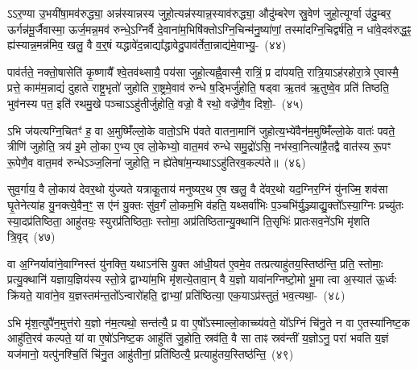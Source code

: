 ऽऽर॒ण्या उ॒भयी॑षा॒मव॑रुद्ध्या॒ अन्न॑स्यान्नस्य जुहो॒त्यन्न॑स्यान्न॒स्याव॑रुद्ध्या॒ औदु॑म्बरेण स्रु॒वेण॑ जुहो॒त्यूर्ग्वा उ॑दु॒म्बर॒ ऊर्गन्न॑मू॒र्जैवास्मा॒ ऊर्ज॒मन्न॒मव॑ रुन्धे॒\-ऽग्निर्वै दे॒वाना॑म॒भिषि॑क्तो\-ऽग्नि॒चिन्म॑नु॒ष्या॑णां॒ तस्मा॑दग्नि॒चिद्वर्\mbox{}ष॑ति॒ न धा॑वे॒दव॑रुद्ध॒ꣴ॒ ह्य॑स्यान्न॒मन्न॑मिव॒ खलु॒ वै व॒र्॒\mbox{}षं यद्धावे॑द॒न्नाद्या᳚द्धावेदु॒पाव॑र्तेता॒न्नाद्य॑मे॒वाभ्यु॒-~(४४)\ip

पाव॑र्तते॒ नक्तो॒षासेति॑ कृ॒ष्णायै᳚ श्वे॒तव॑थ्सायै॒ पय॑सा जुहो॒त्यह्नै॒वास्मै॒ रात्रिं॒ प्र दा॑पयति॒ रात्रि॒या\-ऽह॑रहोरा॒त्रे ए॒वास्मै॒ प्रत्ते॒ काम॑म॒न्नाद्यं॑ दुहाते राष्ट्र॒भृतो॑ जुहोति रा॒ष्ट्रमे॒वाव॑ रुन्धे ष॒ड्भिर्जु॑होति॒ षड्वा ऋ॒तव॑ ऋ॒तुष्वे॒व प्रति॑ तिष्ठति॒ भुव॑नस्य पत॒ इति॑ रथमु॒खे पञ्चा\-ऽऽहु॑तीर्जुहोति॒ वज्रो॒ वै रथो॒ वज्रे॑णै॒व दिशो॒-~(४५)\ip

ऽभि ज॑यत्यग्नि॒चितꣳ॑ ह॒ वा अ॒मुष्मिँ॑ल्लो॒के वातो॒\-ऽभि प॑वते वातना॒मानि॑ जुहोत्य॒भ्ये॑वैन॑म॒मुष्मिँ॑ल्लो॒के वातः॑ पवते॒ त्रीणि॑ जुहोति॒ त्रय॑ इ॒मे लो॒का ए॒भ्य ए॒व लो॒केभ्यो॒ वात॒मव॑ रुन्धे समु॒द्रो॑\-ऽसि॒ नभ॑स्वा॒नित्या॑है॒तद्वै वात॑स्य रू॒पꣳ रू॒पेणै॒व वात॒मव॑ रुन्धे\-ऽञ्ज॒लिना॑ जुहोति॒ न ह्ये॑तेषा॑म॒न्यथा\-ऽऽहु॑तिरव॒कल्प॑ते॥~(४६)\ip

{\anuvakamend[{ओष॑धयः स॒प्ताभि दिशो॒\-ऽन्यथा॒ द्वे च॑}]}

सुव॒र्गाय॒ वै लो॒काय॑ देवर॒थो यु॑ज्यते यत्राकू॒ताय॑ मनुष्यर॒थ ए॒ष खलु॒ वै दे॑वर॒थो यद॒ग्निर॒ग्निं यु॑नज्मि॒ शव॑सा घृ॒तेनेत्या॑ह यु॒नक्त्ये॒वैन॒ꣳ॒ स ए॑नं यु॒क्तः सु॑व॒र्गं लो॒कम॒भि व॑हति॒ यथ्सर्वा॑भिः प॒ञ्चभि॑र्यु॒ञ्ज्याद्यु॒क्तो᳚\-ऽस्या॒ग्निः प्रच्यु॑तः स्या॒दप्र॑तिष्ठिता॒ आहु॑तयः॒ स्युरप्र॑तिष्ठिताः॒ स्तोमा॒ अप्र॑तिष्ठितान्यु॒क्थानि॑ ति॒सृभिः॑ प्रातःसव॒ने॑\-ऽभि मृ॑शति त्रि॒वृद्~(४७)\ip

वा अ॒ग्निर्यावा॑ने॒वाग्निस्तं यु॑नक्ति॒ यथा\-ऽन॑सि यु॒क्त आ॑धी॒यत॑ ए॒वमे॒व तत्प्रत्याहु॑तय॒स्\-तिष्ठ॑न्ति॒ प्रति॒ स्तोमाः॒ प्रत्यु॒क्थानि॑ यज्ञाय॒ज्ञिय॑स्य स्तो॒त्रे द्वाभ्या॑म॒भि मृ॑शत्ये॒तावा॒न् वै य॒ज्ञो यावा॑नग्निष्टो॒मो भू॒मा त्वा अ॒स्यात॑ ऊ॒र्ध्वः क्रि॑यते॒ यावा॑ने॒व य॒ज्ञस्तम॑न्त॒तो᳚\-ऽन्वारो॑हति॒ द्वाभ्यां॒ प्रति॑ष्ठित्या॒ एक॒या\-ऽप्र॑स्तुतं॒ भव॒त्यथा॒-~(४८)\ip

ऽभि मृ॑श॒त्युपै॑न॒मुत्त॑रो य॒ज्ञो न॑म॒त्यथो॒ सन्त॑त्यै॒ प्र वा ए॒षो᳚\-ऽस्माल्लो॒काच्च्य॑वते॒ यो᳚\-ऽग्निं चि॑नु॒ते न वा ए॒तस्या॑निष्ट॒क आहु॑ति॒रव॑ कल्पते॒ यां वा ए॒षो॑\-ऽनिष्ट॒क आहु॑तिं जु॒होति॒ स्रव॑ति॒ वै सा ताꣴ स्रव॑न्तीं य॒ज्ञो\-ऽनु॒ परा॑ भवति य॒ज्ञं यज॑मानो॒ यत्पु॑नश्चि॒तिं चि॑नु॒त आहु॑तीनां॒ प्रति॑ष्ठित्यै॒ प्रत्याहु॑तय॒स्तिष्ठ॑न्ति॒~(४९)\ip

